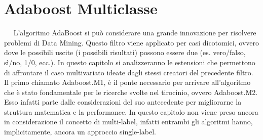 \chapter{Adaboost Multiclasse}
\ \
\newline
L'algoritmo AdaBoost si pu\`o considerare una grande innovazione per risolvere problemi di Data Mining.
Questo filtro viene applicato per casi dicotomici, ovvero dove le possibili uscite (i possibili risultati)
possono essere due (es. vero/falso, s\`i/no, 1/0, ecc.). In questo capitolo si analizzeranno le estensioni
che permettono di affrontare il caso multivariato ideate dagli stessi creatori del precedente filtro. Il primo chiamato
Adaboost.M1, \`e il ponte necessario per arrivare all'algoritmo che \`e stato fondamentale per le ricerche svolte
nel tirocinio, ovvero Adaboost.M2. Esso infatti parte dalle considerazioni del suo antecedente per migliorarne
la struttura matematica e la performance. In questo capitolo non viene preso ancora 
in considerazione il concetto di multi-label, 
infatti entrambi gli algoritmi hanno, implicitamente, ancora un approccio single-label.
